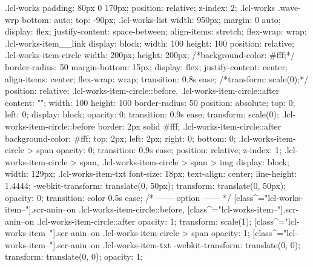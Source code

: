 .lcl-works {
	padding: 80px 0 170px;
	position: relative;
	z-index: 2;
}
.lcl-works .wave-wrp {
	bottom: auto;
	top: -90px;
}
.lcl-works-list {
	width: 950px;
	margin: 0 auto;
	display: flex;
	justify-content: space-between;
	align-items: stretch;
	flex-wrap: wrap;
}
.lcl-works-item__link {
	display: block;
	width: 100%
	height: 100%
	position: relative;
}
.lcl-works-item-circle {
	width: 200px;
	height: 200px;
	/*background-color: #fff;*/
	border-radius: 50%
	margin-bottom: 15px;
	display: flex;
	justify-content: center;
	align-items: center;
	flex-wrap: wrap;
	transition: 0.8s ease;
	/*transform: scale(0);*/
	position: relative;
}
.lcl-works-item-circle::before,
.lcl-works-item-circle::after {
	content: "";
	width: 100%
	height: 100%
	border-radius: 50%
	position: absolute;
	top: 0;
	left: 0;
	display: block;
	opacity: 0;
	transition: 0.9s ease;
	transform: scale(0);
}
.lcl-works-item-circle::before {
	border: 2px solid #fff;
}
.lcl-works-item-circle::after {
	background-color: #fff;
	top: 2px;
	left: 2px;
	right: 0;
	bottom: 0;
}
.lcl-works-item-circle > span {
	opacity: 0;
	transition: 0.9s ease;
	position: relative;
	z-index: 1;
}
.lcl-works-item-circle > span,
.lcl-works-item-circle > span > img {
	display: block;
	width: 129px;
}
.lcl-works-item-txt {
	font-size: 18px;
	text-align: center;
	line-height: 1.4444;
	-webkit-transform: translate(0, 50px);
	transform: translate(0, 50px);
	opacity: 0;
	transition: color 0.5s ease;
}
/* ------ option ------ */
[class^="lcl-works-item--"].scr-anin--on .lcl-works-item-circle::before,
[class^="lcl-works-item--"].scr-anin--on .lcl-works-item-circle::after {
	opacity: 1;
	transform: scale(1);
}
[class^="lcl-works-item--"].scr-anin--on .lcl-works-item-circle > span {
	opacity: 1;
}
[class^="lcl-works-item--"].scr-anin--on .lcl-works-item-txt {
	-webkit-transform: translate(0, 0);
	transform: translate(0, 0);
	opacity: 1;
}
